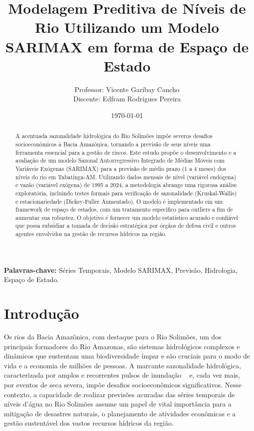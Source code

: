\documentclass[ 12pt,a4paper ]{article} %
\title{\textbf{Modelagem Preditiva de Níveis de Rio Utilizando um Modelo SARIMAX em forma de Espaço de Estado}} %
\author{Professor: Vicente Garibay Cancho\\
Discente: Edfram Rodrigues Pereira}
\date{\today} %
\begin{document}
		\maketitle %
		\thispagestyle{fancy}
		
		\begin{abstract}
		
		A acentuada sazonalidade hidrológica do Rio Solimões impõe severos desafios socioeconômicos à Bacia Amazônica, tornando a previsão de seus níveis uma ferramenta essencial para a gestão de riscos. Este estudo propõe o desenvolvimento e a avaliação de um modelo Sazonal Autorregressivo Integrado de Médias Móveis com Variáveis Exógenas (SARIMAX) para a previsão de médio prazo (1 a 4 meses) dos níveis do rio em Tabatinga-AM. Utilizando dados mensais de nível (variável endógena) e vazão (variável exógena) de 1995 a 2024, a metodologia abrange uma rigorosa análise exploratória, incluindo testes formais para verificação de sazonalidade (Kruskal-Wallis) e estacionariedade (Dickey-Fuller Aumentado). O modelo é implementado em um framework de espaço de estados, com um tratamento específico para outliers a fim de aumentar sua robustez. O objetivo é fornecer um modelo estatístico acurado e confiável que possa subsidiar a tomada de decisão estratégica por órgãos de defesa civil e outros agentes envolvidos na gestão de recursos hídricos na região.
		
	\end{abstract}
	
	\noindent %
	\textbf{Palavras-chave:} Séries Temporais, Modelo SARIMAX, Previsão, Hidrologia, Espaço de Estado.
	
	\vspace{1cm} %
		
		\section{Introdução}%
		\label{sect:intro}
		
		Os rios da Bacia Amazônica, com destaque para o Rio Solimões, um dos principais formadores do Rio Amazonas, são sistemas hidrológicos complexos e dinâmicos que sustentam uma biodiversidade ímpar e são cruciais para o modo de vida e a economia de milhões de pessoas. A marcante sazonalidade hidrológica, caracterizada por amplos e recorrentes pulsos de inundação ~\cite{SCHONGART2007} e, cada vez mais, por eventos de seca severa, impõe desafios socioeconômicos significativos. Nesse contexto, a capacidade de realizar previsões acuradas das séries temporais de níveis d'água no Rio Solimões assume um papel de vital importância para a mitigação de desastres naturais, o planejamento de atividades econômicas e a gestão sustentável dos vastos recursos hídricos da região.
		
\end{document}
